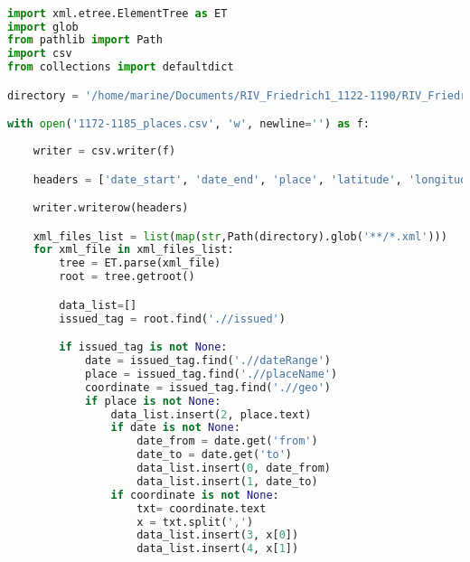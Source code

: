 \label{annexe:script_python_places}

\lstset{style=mystyle}
\begin{lstlisting}[language=Python]

import xml.etree.ElementTree as ET
import glob
from pathlib import Path
import csv
from collections import defaultdict

directory = '/home/marine/Documents/RIV_Friedrich1_1122-1190/RIV_Friedrich1_1172-1185'

with open('1172-1185_places.csv', 'w', newline='') as f:
    
    writer = csv.writer(f)

    headers = ['date_start', 'date_end', 'place', 'latitude', 'longitude']

    writer.writerow(headers)

    xml_files_list = list(map(str,Path(directory).glob('**/*.xml')))
    for xml_file in xml_files_list:
        tree = ET.parse(xml_file)
        root = tree.getroot()

        data_list=[]
        issued_tag = root.find('.//issued')

        if issued_tag is not None:
            date = issued_tag.find('.//dateRange')
            place = issued_tag.find('.//placeName')
            coordinate = issued_tag.find('.//geo')
            if place is not None:
                data_list.insert(2, place.text)
                if date is not None:
                    date_from = date.get('from')
                    date_to = date.get('to')
                    data_list.insert(0, date_from)
                    data_list.insert(1, date_to)
                if coordinate is not None:
                    txt= coordinate.text
                    x = txt.split(',')
                    data_list.insert(3, x[0])
                    data_list.insert(4, x[1])

\end{lstlisting}
